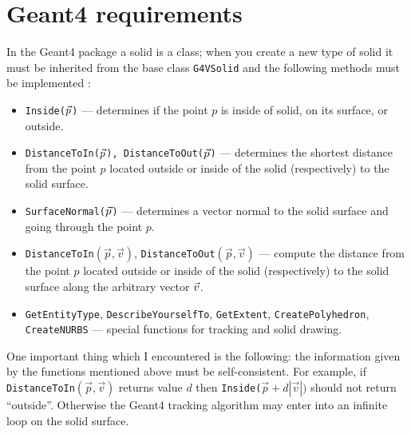 \documentclass{article}
\begin{document}
\section{Geant4 requirements}
In the Geant4 package a solid is a class; when you create a new type of solid
it must be inherited from the base class {\tt G4VSolid} and the following
methods must  be implemented \cite{G4VSolid}:
\begin{itemize}
\item {\tt Inside($\vec{p}\/$)} --- determines if the point $p$ 
is inside of solid, on its surface, or outside.
\item {\tt DistanceToIn($\vec{p}\/$), DistanceToOut($\vec{p}\/$)} 
--- determines the shortest distance from the point $p$ 
located outside or inside of the solid (respectively) to the solid surface.
\item {\tt SurfaceNormal($\vec{p}\/$)} --- 
determines a vector normal to the solid surface and going through the point
$p$. 
\item {\tt DistanceToIn$(\vec{p}, \vec{v})$}, 
{\tt DistanceToOut$(\vec{p}, \vec{v})$} --- compute the distance
from the point $p$ located outside or inside of the solid (respectively)
to the solid surface along the arbitrary vector $\vec{v}\/$.
\item {\tt GetEntityType}, {\tt DescribeYourselfTo}, {\tt GetExtent},
{\tt CreatePolyhedron}, 
{\tt CreateNURBS} --- special functions for tracking and solid drawing.
\end{itemize}

One important thing which I encountered is the following: the information
given by the functions mentioned above must be self-consistent. For
example, if {\tt DistanceToIn$(\vec{p}, \vec{v})$} returns value $d$ then
{\tt Inside($\vec{p} + d |\vec{v}|)$} should not return ``outside''. Otherwise
the Geant4 tracking algorithm may enter into an infinite loop on the solid surface.
\end{document}
